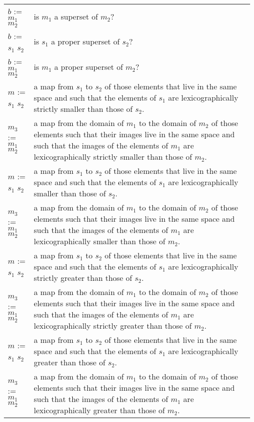 \begin{supertabular}{p{0.35\textwidth}p{0.6\textwidth}}
$b$ := $m_1$ \ai[\tt]{>=} $m_2$ & is $m_1$ a superset of $m_2$?
\\
$b$ := $s_1$ \ai[\tt]{>} $s_2$ & is $s_1$ a proper superset of $s_2$?
\\
$b$ := $m_1$ \ai[\tt]{>} $m_2$ & is $m_1$ a proper superset of $m_2$?
\\
$m$ := $s_1$ \ai[\tt]{<<} $s_2$ & a map from
$s_1$ to $s_2$ of those elements that live in the same space and
such that the elements of $s_1$ are lexicographically strictly smaller
than those of $s_2$.
\\
$m_3$ := $m_1$ \ai[\tt]{<<} $m_2$ & a map from the domain of
$m_1$ to the domain of $m_2$ of those elements such that their images
live in the same space and such that the images of the elements of
$m_1$ are lexicographically strictly smaller than those of $m_2$.
\\
$m$ := $s_1$ \ai[\tt]{<<=} $s_2$ & a map from
$s_1$ to $s_2$ of those elements that live in the same space and
such that the elements of $s_1$ are lexicographically smaller
than those of $s_2$.
\\
$m_3$ := $m_1$ \ai[\tt]{<<=} $m_2$ & a map from the domain of
$m_1$ to the domain of $m_2$ of those elements such that their images
live in the same space and such that the images of the elements of
$m_1$ are lexicographically smaller than those of $m_2$.
\\
$m$ := $s_1$ \ai[\tt]{>>} $s_2$ & a map from
$s_1$ to $s_2$ of those elements that live in the same space and
such that the elements of $s_1$ are lexicographically strictly greater
than those of $s_2$.
\\
$m_3$ := $m_1$ \ai[\tt]{>>} $m_2$ & a map from the domain of
$m_1$ to the domain of $m_2$ of those elements such that their images
live in the same space and such that the images of the elements of
$m_1$ are lexicographically strictly greater than those of $m_2$.
\\
$m$ := $s_1$ \ai[\tt]{>>=} $s_2$ & a map from
$s_1$ to $s_2$ of those elements that live in the same space and
such that the elements of $s_1$ are lexicographically greater
than those of $s_2$.
\\
$m_3$ := $m_1$ \ai[\tt]{>>=} $m_2$ & a map from the domain of
$m_1$ to the domain of $m_2$ of those elements such that their images
live in the same space and such that the images of the elements of
$m_1$ are lexicographically greater than those of $m_2$.
\\
\end{supertabular}
